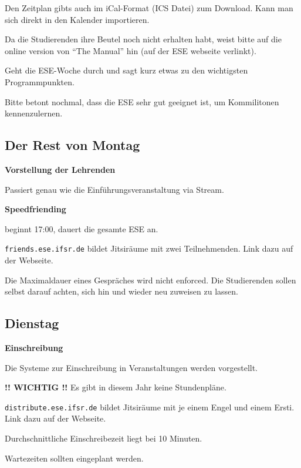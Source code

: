 \documentclass[a4paper,12pt]{scrreprt}
\begin{document}
\begin{itemize*}
    \item Den Zeitplan gibts auch im iCal-Format (ICS Datei) zum Download.
    Kann man sich direkt in den Kalender importieren.
    \item Da die Studierenden ihre Beutel noch nicht erhalten habt, weist bitte auf die online version von \enquote{The Manual} hin (auf der ESE webseite verlinkt).
    \item Geht die ESE-Woche durch und sagt kurz etwas zu den wichtigsten Programmpunkten.
    \item Bitte betont nochmal, dass die ESE sehr gut geeignet ist, um Kommilitonen kennenzulernen.
\end{itemize*}


\subsection{Der Rest von Montag}

\textbf{Vorstellung der Lehrenden}
\begin{itemize*}
    \item Passiert genau wie die Einführungsveranstaltung via Stream.
\end{itemize*}

\textbf{Speedfriending}
\begin{itemize*}
    \item beginnt 17:00, dauert die gesamte ESE an.
    \item \texttt{friends.ese.ifsr.de} bildet Jitsiräume mit zwei Teilnehmenden. Link dazu auf der Webseite.
    \item Die Maximaldauer eines Gespräches wird nicht enforced. Die Studierenden sollen selbst darauf achten, sich hin und wieder neu zuweisen zu lassen.
\end{itemize*}


\subsection{Dienstag}

\textbf{Einschreibung}
\begin{itemize*}
    \item Die Systeme zur Einschreibung in Veranstaltungen werden vorgestellt.
    \item \textbf{!! WICHTIG !!} Es gibt in diesem Jahr keine Stundenpläne.
    \item \texttt{distribute.ese.ifsr.de} bildet Jitsiräume mit je einem Engel und einem Ersti. Link dazu auf der Webseite.
    \item Durchschnittliche Einschreibezeit liegt bei 10 Minuten.
    \item Wartezeiten sollten eingeplant werden.
\end{itemize*}
\end{document}
